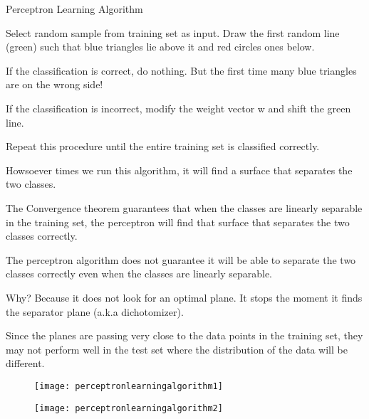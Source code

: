 Perceptron Learning Algorithm
	\begin{numberedlist}
		\item Select random sample from training set as input. Draw the first random line (green) such that blue triangles lie above it and red circles ones below.
		\item If the classification is correct, do nothing. But the first time many blue triangles are on the wrong side!
		\item If the classification is incorrect, modify the weight vector w and shift the green line.
		\item Repeat this procedure until the entire training set is classified correctly.
		\item Howsoever times we run this algorithm, it will find a surface that separates the two classes.
		\item The Convergence theorem guarantees that when the classes are linearly separable in the training set, the perceptron will find that surface that separates the two classes correctly.
		\item The perceptron algorithm does not guarantee it will be able to separate the two classes correctly even when the classes are linearly separable.
		\item Why? Because it does not look for an optimal plane. It stops the moment it finds the separator plane (a.k.a dichotomizer).
		\item Since the planes are passing very close to the data points in the training set, they may not perform well in the test set where the distribution of the data will be different.
	\end{numberedlist}

 	\begin{figure}[h]
		\centering
		\texttt{[image: perceptronlearningalgorithm1]}
		\caption{}
		\label{fig:perceptronlearningalgorithm1}
	\end{figure}
 	\begin{figure}[h]
		\centering
		\texttt{[image: perceptronlearningalgorithm2]}
		\caption{}
		\label{fig:perceptronlearningalgorithm2}
	\end{figure}


